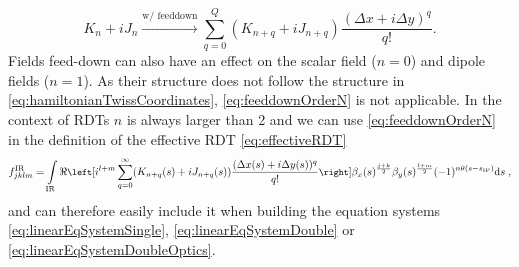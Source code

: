 %
\begin{equation}
    \label{eq:feeddownOrderN}
    K_n + iJ_n \overset{\text{w/ feeddown}}{\rightarrow} \sum_{q = 0}^{Q} (K_{n+q} + iJ_{n+q}) \frac{(\Delta x + i \Delta y)^q}{q!}.
\end{equation}
%
Fields feed-down can also have an effect on the scalar field ($n = 0$) and dipole fields ($n = 1$).
As their structure does not follow the structure in \cref{eq:hamiltonianTwissCoordinates},
\cref{eq:feeddownOrderN} is not applicable.
In the context of RDTs $n$ is always larger than 2 and we can use \cref{eq:feeddownOrderN} 
in the definition of the effective RDT \cref{eq:effectiveRDT}
%
\begin{equation}
    \label{eq:effectiveRDTfeeddown}
    \small
    f^\text{IR}_{jklm} =  \int\limits_\text{IR} 
    \ReOf{    
     i^{l+m}
     \sum_{q = 0}^{\infty} 
     (K_{n+q}(s) + iJ_{n+q}(s)) \frac{(\Delta x(s) + i \Delta y(s))^q}{q!} 
    }
        \beta_x(s)^{\frac{j+k}{2}}
        \beta_y(s)^{\frac{l+m}{2}} 
     (-1)^{  n \theta(s - s_\text{IP})}
    \mathrm{d}s \; ,
\end{equation}
%
and can therefore easily include it when building the equation systems 
\cref{eq:linearEqSystemSingle}, \cref{eq:linearEqSystemDouble} or \cref{eq:linearEqSystemDoubleOptics}.

